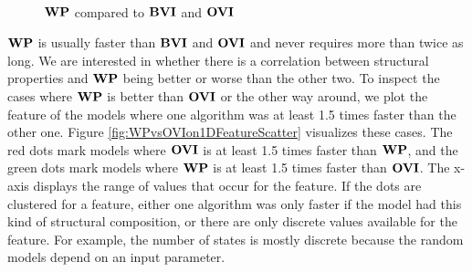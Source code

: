 \begin{figure}[h!]
    \centering
    \
    \caption{$\mathbf{WP}$ compared to $\mathbf{BVI}$ and $\mathbf{OVI}$}%
    \label{fig:WPvsBVIvsOVI}%
    \end{figure}
\FloatBarrier

$\mathbf{WP}$ is usually faster than $\mathbf{BVI}$ and $\mathbf{OVI}$ and never requires more than twice as long.
We are interested in whether there is a correlation between structural properties and $\mathbf{WP}$ being better or worse than the other two.
To inspect the cases where $\mathbf{WP}$ is better than $\mathbf{OVI}$ or the other way around, we plot the feature of the models where one algorithm was at least
1.5 times faster than the other one. Figure \ref{fig:WPvsOVIon1DFeatureScatter} visualizes these cases. 
The red dots mark models where $\mathbf{OVI}$ is at least 1.5 times faster than $\mathbf{WP}$, and the green dots mark models where $\mathbf{WP}$ is at least 1.5 times faster than $\mathbf{OVI}$.
The x-axis displays the range of values that occur for the feature. 
If the dots are clustered for a feature, either one algorithm was only faster if the model had this kind of structural composition, 
or there are only discrete values available for the feature. For example, the number of states is mostly discrete because the random models depend on an input parameter.

